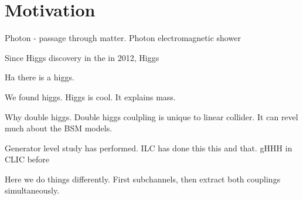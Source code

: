 \section{Motivation}



Photon - passage through matter. Photon electromagnetic shower


Since Higgs discovery in the \LHC in 2012, Higgs



Ha there is a higgs.

We found higgs. Higgs is cool. It explains mass.

Why double higgs. Double higgs coulpling is unique to linear collider. It can revel much about the BSM models.

Generator level study has performed. ILC has done this this and that. gHHH in CLIC before

Here we do things differently. First subchannels, then extract both couplings simultaneously.

